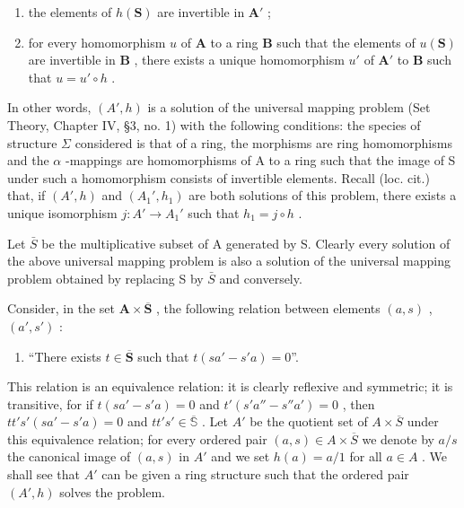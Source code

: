 \begin{enumerate}
\def\labelenumi{(\arabic{enumi})}
\item
  the elements of \(h(\mathbf{S})\) are invertible in \(\mathbf{A}'\) ;
\item
  for every homomorphism \(u\) of \(\mathbf{A}\) to a ring \(\mathbf{B}\) such that the elements of \(u(\mathbf{S})\) are invertible in \(\mathbf{B}\) , there exists a unique homomorphism \(u'\) of \(\mathbf{A}'\) to \(\mathbf{B}\) such that \(u = u' \circ h\) .
\end{enumerate}

In other words, \((A', h)\) is a solution of the universal mapping problem (Set Theory, Chapter IV, §3, no. 1) with the following conditions: the species of structure \(\Sigma\) considered is that of a ring, the morphisms are ring homomorphisms and the \(\alpha\) -mappings are homomorphisms of A to a ring such that the image of S under such a homomorphism consists of invertible elements. Recall (loc. cit.) that, if \((A', h)\) and \((A_{1}', h_{1})\) are both solutions of this problem, there exists a unique isomorphism \(j: A' \to A_{1}'\) such that \(h_{1} = j \circ h\) .

Let \(\bar{S}\) be the multiplicative subset of A generated by S. Clearly every solution of the above universal mapping problem is also a solution of the universal mapping problem obtained by replacing S by \(\bar{S}\) and conversely.

Consider, in the set \(\mathbf{A} \times \overline{\mathbf{S}}\) , the following relation between elements \((a, s)\) , \((a', s')\) :

\begin{enumerate}
\def\labelenumi{(\arabic{enumi})}
\tightlist
\item
 ``There exists \(t \in \overline{\mathbf{S}}\) such that \(t(sa' - s'a) = 0\)''.
\end{enumerate}

This relation is an equivalence relation: it is clearly reflexive and symmetric; it is transitive, for if \(t(sa' - s'a) = 0\) and \(t'(s'a'' - s''a') = 0\) , then \(tt's'(sa' - s'a) = 0\) and \(tt's' \in \overline{\mathbb{S}}\) . Let \(A'\) be the quotient set of \(A \times \overline{S}\) under this equivalence relation; for every ordered pair \((a, s) \in A \times \overline{S}\) we denote by \(a/s\) the canonical image of \((a, s)\) in \(A'\) and we set \(h(a) = a/1\) for all \(a \in A\) . We shall see that \(A'\) can be given a ring structure such that the ordered pair \((A', h)\) solves the problem.

